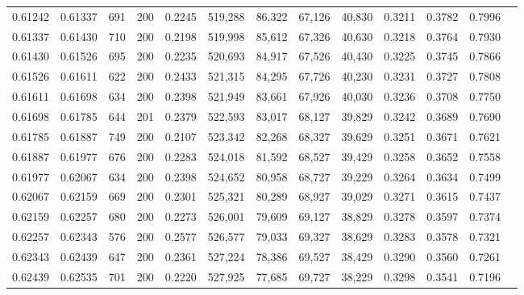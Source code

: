\begin{tabular}{rrrrrrrrrrrrr}
0.61242 & 0.61337 &   691 & 200 &                                     0.2245 & 519,288 &  86,322 &  67,126 &  40,830 & 0.3211 & 0.3782 & 0.7996 \\
0.61337 & 0.61430 &   710 & 200 &                                     0.2198 & 519,998 &  85,612 &  67,326 &  40,630 & 0.3218 & 0.3764 & 0.7930 \\
0.61430 & 0.61526 &   695 & 200 &                                     0.2235 & 520,693 &  84,917 &  67,526 &  40,430 & 0.3225 & 0.3745 & 0.7866 \\
0.61526 & 0.61611 &   622 & 200 &                                     0.2433 & 521,315 &  84,295 &  67,726 &  40,230 & 0.3231 & 0.3727 & 0.7808 \\
0.61611 & 0.61698 &   634 & 200 &                                     0.2398 & 521,949 &  83,661 &  67,926 &  40,030 & 0.3236 & 0.3708 & 0.7750 \\
0.61698 & 0.61785 &   644 & 201 &                                     0.2379 & 522,593 &  83,017 &  68,127 &  39,829 & 0.3242 & 0.3689 & 0.7690 \\
0.61785 & 0.61887 &   749 & 200 &                                     0.2107 & 523,342 &  82,268 &  68,327 &  39,629 & 0.3251 & 0.3671 & 0.7621 \\
0.61887 & 0.61977 &   676 & 200 &                                     0.2283 & 524,018 &  81,592 &  68,527 &  39,429 & 0.3258 & 0.3652 & 0.7558 \\
0.61977 & 0.62067 &   634 & 200 &                                     0.2398 & 524,652 &  80,958 &  68,727 &  39,229 & 0.3264 & 0.3634 & 0.7499 \\
0.62067 & 0.62159 &   669 & 200 &                                     0.2301 & 525,321 &  80,289 &  68,927 &  39,029 & 0.3271 & 0.3615 & 0.7437 \\
0.62159 & 0.62257 &   680 & 200 &                                     0.2273 & 526,001 &  79,609 &  69,127 &  38,829 & 0.3278 & 0.3597 & 0.7374 \\
0.62257 & 0.62343 &   576 & 200 &                                     0.2577 & 526,577 &  79,033 &  69,327 &  38,629 & 0.3283 & 0.3578 & 0.7321 \\
0.62343 & 0.62439 &   647 & 200 &                                     0.2361 & 527,224 &  78,386 &  69,527 &  38,429 & 0.3290 & 0.3560 & 0.7261 \\
0.62439 & 0.62535 &   701 & 200 &                                     0.2220 & 527,925 &  77,685 &  69,727 &  38,229 & 0.3298 & 0.3541 & 0.7196 \\

\end{tabular}

